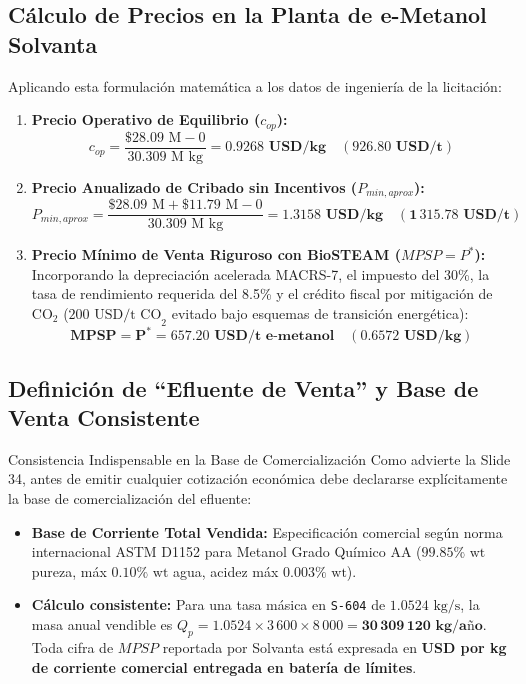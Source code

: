 \documentclass[11pt,letterpaper]{article}
\begin{document}
\subsection{Cálculo de Precios en la Planta de e-Metanol Solvanta}
Aplicando esta formulación matemática a los datos de ingeniería de la licitación:
\begin{enumerate}
    \item \textbf{Precio Operativo de Equilibrio ($c_{op}$):}
    \begin{equation}
        c_{op} = \frac{\$28.09\text{ M} - 0}{30.309\text{ M kg}} = \mathbf{0.9268\text{ USD/kg}} \quad (\mathbf{926.80\text{ USD/t}})
    \end{equation}
    \item \textbf{Precio Anualizado de Cribado sin Incentivos ($P_{min,aprox}$):}
    \begin{equation}
        P_{min,aprox} = \frac{\$28.09\text{ M} + \$11.79\text{ M} - 0}{30.309\text{ M kg}} = \mathbf{1.3158\text{ USD/kg}} \quad (\mathbf{1\,315.78\text{ USD/t}})
    \end{equation}
    \item \textbf{Precio Mínimo de Venta Riguroso con BioSTEAM ($MPSP = P^*$):}
    Incorporando la depreciación acelerada MACRS-7, el impuesto del 30\%, la tasa de rendimiento requerida del 8.5\% y el crédito fiscal por mitigación de $\text{CO}_2$ ($200\text{ USD/t CO}_2$ evitado bajo esquemas de transición energética):
    \begin{equation}
        \mathbf{MPSP = P^* = 657.20\text{ USD/t e-metanol}} \quad (\mathbf{0.6572\text{ USD/kg}})
    \end{equation}
\end{enumerate}

\subsection{Definición de ``Efluente de Venta'' y Base de Venta Consistente}
\begin{conceptbox}{Consistencia Indispensable en la Base de Comercialización}
Como advierte la Slide 34, antes de emitir cualquier cotización económica debe declararse explícitamente la base de comercialización del efluente:
\begin{itemize}
    \item \textbf{Base de Corriente Total Vendida:} Especificación comercial según norma internacional ASTM D1152 para Metanol Grado Químico AA ($99.85\%\text{ wt}$ pureza, máx $0.10\%\text{ wt}$ agua, acidez máx $0.003\%\text{ wt}$).
    \item \textbf{Cálculo consistente:} Para una tasa másica en \texttt{S-604} de $1.0524\text{ kg/s}$, la masa anual vendible es $Q_p = 1.0524 \times 3\,600 \times 8\,000 = \mathbf{30\,309\,120\text{ kg/año}}$. Toda cifra de $MPSP$ reportada por Solvanta está expresada en \textbf{USD por kg de corriente comercial entregada en batería de límites}.
\end{itemize}
\end{conceptbox}
\end{document}

